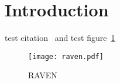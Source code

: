 \section{Introduction}
\label{sec:introduction}

test citation~\cite{Nureg1150} and test figure~\ref{fig:raven}

\begin{figure}
    \centering
    \texttt{[image: raven.pdf]}
    \caption{RAVEN}
    \label{fig:raven}
\end{figure}
